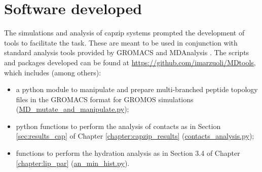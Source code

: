 \clearpage
\section{Software developed}
\label{sec:Appendix_software}

The simulations and analysis of capzip systems prompted the development of tools to facilitate the task.
%
These are meant to be used in conjunction with standard analysis tools provided by GROMACS \citep{Berendsen1995,Abraham2015,gromacs_man} and MDAnalysis \citep{Michaud-Agrawal2011,Gowers2016}.
%
The scripts and packages developed can be found at \url{https://github.com/imarzuoli/MDtools}, which includes (among others):
\begin{itemize}
\item a python module to manipulate and prepare multi-branched peptide topology files in the GROMACS format for GROMOS simulations (\url{MD_mutate_and_manipulate.py});

\item python functions to perform the analysis of contacts as in Section \ref{sec:results_cap} of Chapter \ref{chapter:capzip_results} (\url{contacts_analysis.py});

\item functions to perform the hydration analysis as in Section 3.4 of Chapter \ref{chapter:lip_par} (\url{an_min_hist.py}).

\end{itemize}
